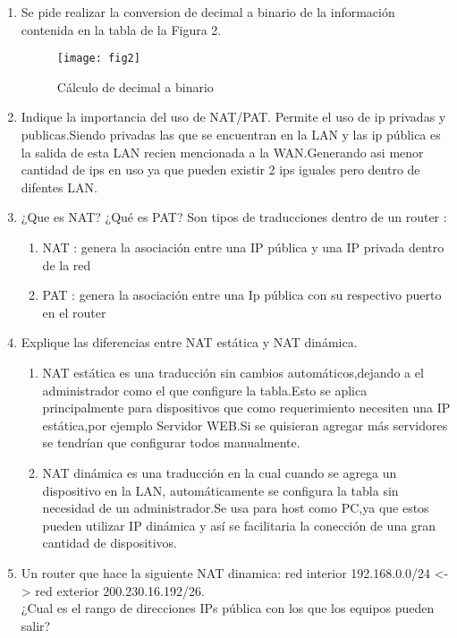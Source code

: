 \documentclass{udparticle}
\begin{document}
\begin{enumerate}
\item Se pide realizar la conversion de decimal a binario de la información contenida en la tabla de la Figura 2.
	\begin{figure}[H]
	\centering
	\texttt{[image: fig2]}
	\caption{Cálculo de decimal a binario}
	\end{figure}

\item Indique la importancia del uso de NAT/PAT.
Permite el uso de ip privadas y publicas.Siendo privadas las que se encuentran en la LAN y las ip pública es la
salida de esta LAN recien mencionada a la WAN.Generando asi menor cantidad de ips en uso ya que pueden existir
2 ips iguales pero dentro de difentes LAN.\\
\item ¿Que es NAT? ¿Qué es PAT?
Son tipos de traducciones dentro de un router :
\begin{enumerate}
	\item NAT : genera la asociación entre una IP pública y una IP privada dentro de la red
	\item PAT : genera la asociación entre una Ip pública con su respectivo puerto en el router
\end{enumerate}
\item Explique las diferencias entre NAT estática y NAT dinámica.
\begin{enumerate}
\item NAT estática es una traducción sin cambios automáticos,dejando a el administrador como
el que configure la tabla.Esto se aplica principalmente para dispositivos que como requerimiento
necesiten una IP estática,por ejemplo Servidor WEB.Si se quisieran agregar más servidores se tendrían que 
configurar todos manualmente.\\
\item NAT dinámica es una traducción en la cual cuando se agrega un dispositivo en la LAN, automáticamente
se configura la tabla sin necesidad de un administrador.Se usa para host como PC,ya que estos pueden utilizar
IP dinámica y así se facilitaria la conección de una gran cantidad de dispositivos.\\
\end{enumerate}
\item Un router que hace la siguiente NAT dinamica: red interior 
192.168.0.0/24 <-> red exterior 200.230.16.192/26.\\
¿Cual es el rango de direcciones IPs pública con los que los equipos 
pueden salir?

\end{enumerate}
\end{document}
